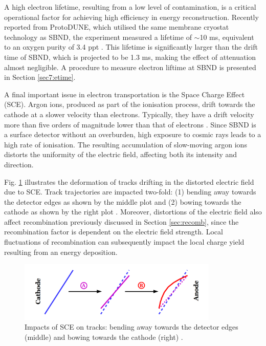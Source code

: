 A high electron lifetime, resulting from a low level of contamination, is a critical operational factor for achieving high efficiency in energy reconstruction.
Recently reported from ProtoDUNE, which utilised the same membrane cryostat technology as SBND, the experiment measured a lifetime of $\sim$10 ms, equivalent to an oxygen purity of 3.4 ppt \cite{protodune}.
This lifetime is significantly larger than the drift time of SBND, which is projected to be 1.3 ms, making the effect of attenuation almost negligible. 
A procedure to measure electron liftime at SBND is presented in Section \ref{sec7:etime}.



A final important issue in electron transportation is the Space Charge Effect (SCE).
Argon ions, produced as part of the ionisation process, drift towards the cathode at a slower velocity than electrons.
Typically, they have a drift velocity more than five orders of magnitude lower than that of electrons \cite{icarus_sce}.
Since SBND is a surface detector without an overburden, high exposure to cosmic rays leads to a high rate of ionisation.
The resulting accumulation of slow-moving argon ions distorts the uniformity of the electric field, affecting both its intensity and direction.

Fig. \ref{fig:SCE} illustrates the deformation of tracks drifting in the distorted electric field due to SCE.
Track trajectories are impacted two-fold: (1) bending away towards the detector edges as shown by the middle plot and (2) bowing towards the cathode as shown by the right plot \cite{SCE}.
Moreover, distortions of the electric field also affect recombination previously discussed in Section \ref{sec:recomb}, since the recombination factor is dependent on the electric field strength.
Local fluctuations of recombination can subsequently impact the local charge yield resulting from an energy deposition.

\begin{figure}[htbp] 
\centering    
\includegraphics[width=0.85\textwidth]{SCE}
\caption[Impacts of Space Charge Effects on Tracks]{
Impacts of SCE on tracks: bending away towards the detector edges (middle) and bowing towards the cathode (right) \cite{SCE}.
}
\label{fig:SCE}
\end{figure}

